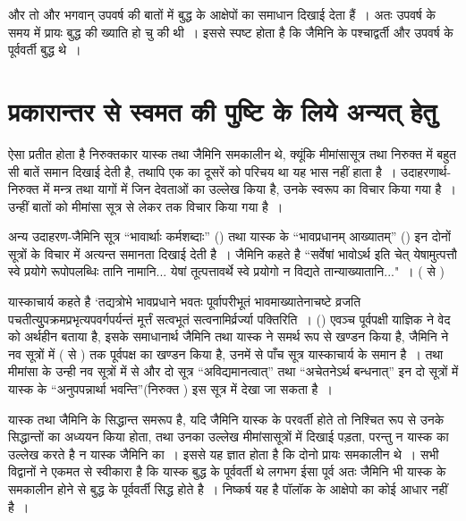 और तो और भगवान् उपवर्ष की बातों में बुद्ध के आक्षेपों का समाधान दिखाई देता हैं~। अतः उपवर्ष के समय में प्रायः बुद्ध की ख्याति हो चु की थी~। इससे स्पष्ट होता है कि जैमिनि के पश्चाद्वर्ती और उपवर्ष के पूर्ववर्ती बुद्ध थे~। 

\section*{प्रकारान्तर से स्वमत की पुष्टि के लिये अन्यत् हेतु}

ऐसा प्रतीत होता है निरुक्तकार यास्क तथा जैमिनि समकालीन थे, क्यूंकि मीमांसासूत्र तथा निरुक्त में बहुत सी बातें समान दिखाई देती है, तथापि एक का दूसरें को परिचय था यह भास नहीं हाता है~। उदाहरणार्थ-निरुक्त  में मन्त्र तथा यागों में जिन देवताओं का उल्लेख किया है, उनके स्वरूप का विचार किया गया है~। उन्हीं बातों को मीमांसा सूत्र  से लेकर  तक विचार किया गया है~। 

अन्य उदाहरण-जैमिनि सूत्र “भावार्थाः कर्मशब्दाः” () तथा यास्क के “भावप्रधानम् आख्यातम्” () इन दोनों सूत्रों के विचार में अत्यन्त समानता दिखाई देती है~। जैमिनि कहते है “सर्वेषां भावोऽर्थ इति चेत् येषामुत्पत्तौ स्वे प्रयोगे रूपोपलब्धिः तानि नामानि... येषां तूत्पत्तावर्थे स्वे प्रयोगो न विद्यते तान्याख्यातानि..."~। ( से )

यास्काचार्य कहते है ‘तद्यत्रोभे भावप्रधाने भवतः पूर्वापरीभूतं भावमाख्यातेनाचष्टे व्रजति पचतीत्युुपक्रमप्रभृत्यपवर्गपर्यन्तं मूर्त्तं सत्वभूतं सत्वनामिर्व्रर्ज्या पक्तिरिति~। () एवञ्च पूर्वपक्षी याज्ञिक ने वेद को अर्थहीन बताया है, इसके समाधानार्थ जैमिनि तथा यास्क ने समर्थ रूप से खण्डन किया है, जैमिनि ने नव सूत्रों में ( से ) तक पूर्वपक्ष का खण्डन किया है, उनमें से पाँच सूत्र यास्काचार्य के समान है~। तथा मीमांसा के उन्ही नव सूत्रों में से और दो सूत्र “अविद्यमानत्वात्” तथा “अचेतनेऽर्थ बन्धनात्” इन दो सूत्रों में यास्क के “अनुपपन्नार्था भवन्ति”(निरुक्त ) इस सूत्र में देखा जा सकता है~।

यास्क तथा जैमिनि के सिद्धान्त समरूप है, यदि जैमिनि यास्क के परवर्ती होते तो निश्चित रूप से उनके सिद्धान्तों का अध्ययन किया होता, तथा उनका उल्लेख मीमांसासूत्रों में दिखाई पड़ता, परन्तु न यास्क का उल्लेख करते है न यास्क जैमिनि का~। इससे यह ज्ञात होता है कि दोनो प्रायः समकालीन थे~। सभी विद्वानों ने एकमत से स्वीकारा है कि यास्क बुद्ध के पूर्ववर्ती थे लगभग  ईसा पूर्व अतः जैमिनि भी यास्क के समकालीन होने से बुद्ध के पूर्ववर्ती सिद्ध होते है~। निष्कर्ष यह है पॉलॉक के आक्षेपो का कोई आधार नहीं है~।

